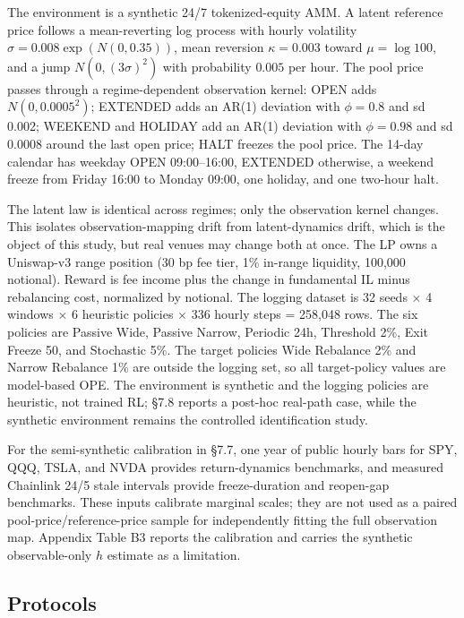 The environment is a synthetic 24/7 tokenized-equity AMM. A latent reference price follows a mean-reverting log process with hourly volatility $\sigma=0.008\exp(N(0,0.35))$, mean reversion $\kappa=0.003$ toward $\mu=\log 100$, and a jump $N(0,(3\sigma)^2)$ with probability $0.005$ per hour. The pool price passes through a regime-dependent observation kernel: OPEN adds $N(0,0.0005^2)$; EXTENDED adds an AR(1) deviation with $\phi=0.8$ and sd 0.002; WEEKEND and HOLIDAY add an AR(1) deviation with $\phi=0.98$ and sd 0.0008 around the last open price; HALT freezes the pool price. The 14-day calendar has weekday OPEN 09:00--16:00, EXTENDED otherwise, a weekend freeze from Friday 16:00 to Monday 09:00, one holiday, and one two-hour halt.

The latent law is identical across regimes; only the observation kernel changes. This isolates observation-mapping drift from latent-dynamics drift, which is the object of this study, but real venues may change both at once. The LP owns a Uniswap-v3 range position (30 bp fee tier, 1\% in-range liquidity, 100,000 notional). Reward is fee income plus the change in fundamental IL minus rebalancing cost, normalized by notional. The logging dataset is 32 seeds $\times$ 4 windows $\times$ 6 heuristic policies $\times$ 336 hourly steps = 258,048 rows. The six policies are Passive Wide, Passive Narrow, Periodic 24h, Threshold 2\%, Exit Freeze 50, and Stochastic 5\%. The target policies Wide Rebalance 2\% and Narrow Rebalance 1\% are outside the logging set, so all target-policy values are model-based OPE. The environment is synthetic and the logging policies are heuristic, not trained RL; \S7.8 reports a post-hoc real-path case, while the synthetic environment remains the controlled identification study.

For the semi-synthetic calibration in \S7.7, one year of public hourly bars for SPY, QQQ, TSLA, and NVDA provides return-dynamics benchmarks, and measured Chainlink 24/5 stale intervals provide freeze-duration and reopen-gap benchmarks. These inputs calibrate marginal scales; they are not used as a paired pool-price/reference-price sample for independently fitting the full observation map. Appendix Table B3 reports the calibration and carries the synthetic observable-only $h$ estimate as a limitation.

\subsection{Protocols}

